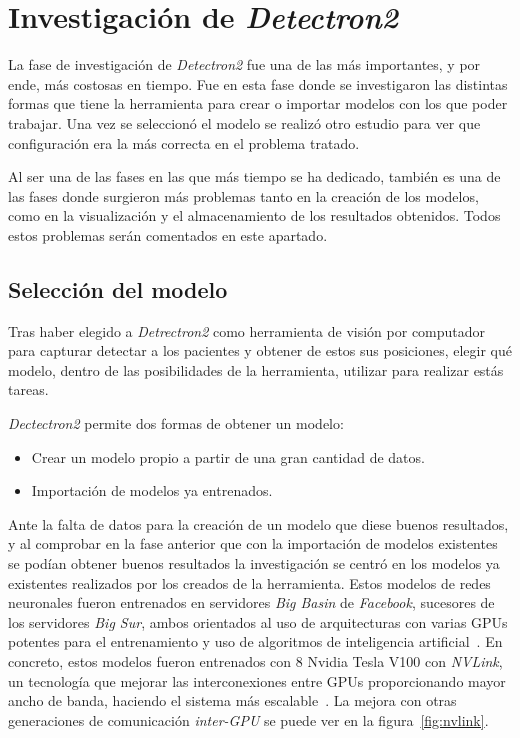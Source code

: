 \section{Investigación de \textit{Detectron2}}
La fase de investigación de \textit{Detectron2} fue una de las más importantes, y por ende, más costosas en tiempo. Fue en esta fase donde se investigaron las distintas formas que tiene la herramienta para crear o importar modelos con los que poder trabajar. Una vez se seleccionó el modelo se realizó otro estudio para ver que configuración era la más correcta en el problema tratado.

Al ser una de las fases en las que más tiempo se ha dedicado, también es una de las fases donde surgieron más problemas tanto en la creación de los modelos, como en la visualización y el almacenamiento de los resultados obtenidos. Todos estos problemas serán comentados en este apartado.  
\subsection{Selección del modelo}
Tras haber elegido a \textit{Detrectron2} como herramienta de visión por computador para capturar detectar a los pacientes y obtener de estos sus posiciones, elegir qué modelo, dentro de las posibilidades de la herramienta, utilizar para realizar estás tareas.

\textit{Dectectron2} permite dos formas de obtener un modelo:
\begin{itemize}
	\item Crear un modelo propio a partir de una gran cantidad de datos.
	\item Importación de modelos ya entrenados.
\end{itemize}

Ante la falta de datos para la creación de un modelo que diese buenos resultados, y al comprobar en la fase anterior que con la importación de modelos existentes se podían obtener buenos resultados la investigación se centró en los modelos ya existentes realizados por los creados de la herramienta. Estos modelos de redes neuronales fueron entrenados en servidores \textit{Big Basin} de \textit{Facebook}, sucesores de los servidores \textit{Big Sur}, ambos orientados al uso de arquitecturas con varias GPUs potentes para el entrenamiento y uso de algoritmos de inteligencia artificial~\cite{bigbasin}. En concreto, estos modelos fueron entrenados con 8 Nvidia Tesla V100 con \textit{NVLink}, un tecnología que mejorar las interconexiones entre GPUs proporcionando mayor ancho de banda, haciendo el sistema más escalable~\cite{nvlink}. La mejora con otras generaciones de comunicación \textit{inter-GPU} se puede ver en la figura~\ref{fig:nvlink}.

